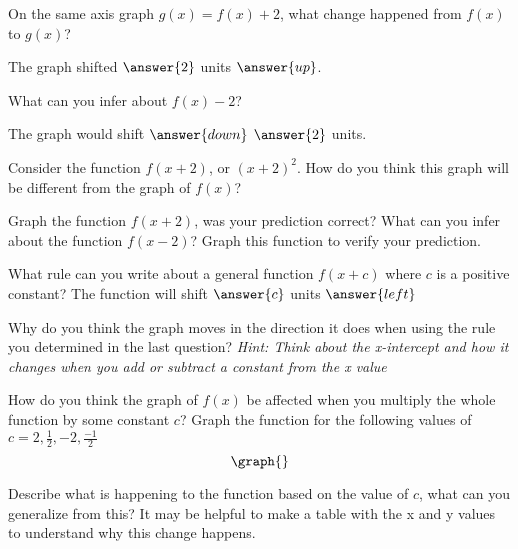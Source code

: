 \documentclass{ximera}
\begin{document}
\begin{question}

On the same axis graph $g(x)=f(x)+2$, what change happened from $f(x)$ to $g(x)$?

The graph shifted $\answer{2}$ units $\answer{up}$.

What can you infer about $f(x)-2$?

The graph would shift $\answer{down}$ $\answer{2}$ units.

Consider the function $f(x+2)$, or $(x+2)^2$. How do you think this graph will be different from the graph of $f(x)$?
\begin{freeResponse}
\end{freeResponse}
Graph the function $f(x+2)$, was your prediction correct? What can you infer about the function $f(x-2)$? Graph this function to verify your prediction.
\begin{freeResponse}
\end{freeResponse}
What rule can you write about a general function $f(x+c)$ where $c$ is a positive constant?
The function will shift $\answer{c}$ units $\answer{left}$

Why do you think the graph moves in the direction it does when using the rule you determined in the last question? \textit{Hint: Think about the x-intercept and how it changes when you add or subtract a constant from the x value}
\begin{freeResponse}
\end{freeResponse}
How do you think the graph of $f(x)$ be affected when you multiply the whole function by some constant $c$? Graph the function for the following values of $c=2,\frac{1}{2},-2,\frac{-1}{2}$
\[
\graph{}
\]
\begin{freeResponse}
\end{freeResponse}
Describe what is happening to the function based on the value of $c$, what can you generalize from this? It may be helpful to make a table with the x and y values to understand why this change happens.
\begin{freeResponse}
\end{freeResponse}
\end{question}
\end{document}
